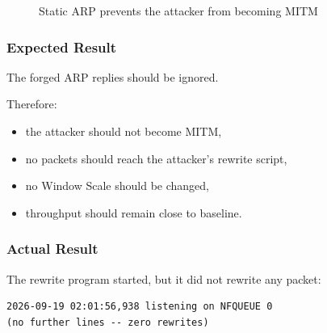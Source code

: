 \documentclass[11pt]{article}
\begin{document}
\begin{figure}[h]
\centering
{}
\caption{Static ARP prevents the attacker from becoming MITM}
\end{figure}

\subsubsection*{Expected Result}

The forged ARP replies should be ignored.

Therefore:

\begin{itemize}
    \item the attacker should not become MITM,
    \item no packets should reach the attacker's rewrite script,
    \item no Window Scale should be changed,
    \item throughput should remain close to baseline.
\end{itemize}

\subsubsection*{Actual Result}

The rewrite program started, but it did not rewrite any packet:

\begin{lstlisting}
2026-09-19 02:01:56,938 listening on NFQUEUE 0
(no further lines -- zero rewrites)
\end{lstlisting}
\end{document}
